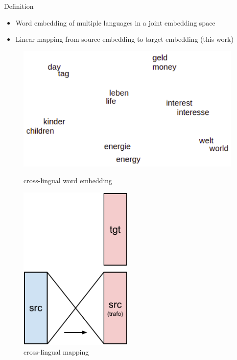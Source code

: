 \documentclass[11pt, a4paper, landscape]{article}
\begin{document}
	\vfill



	\NewPage
	\vfill
	
	Definition
	\begin{itemize}
		\item Word embedding of multiple languages in a joint embedding space		
		\item Linear mapping from source embedding to target embedding (this work)
	\end{itemize}
	\begin{figure}
	\begin{minipage}[b]{0.55\textwidth}
	\includegraphics[width=14cm]{crossembedding}
	\caption{cross-lingual word embedding}	
	
	\end{minipage}
	\begin{minipage}[b]{0.4\textwidth}
		\centering
		\includegraphics[width=0.5\textwidth]{cross-embed}
		\caption{cross-lingual mapping}

	\end{minipage}	
	\end{figure}
\end{document}
